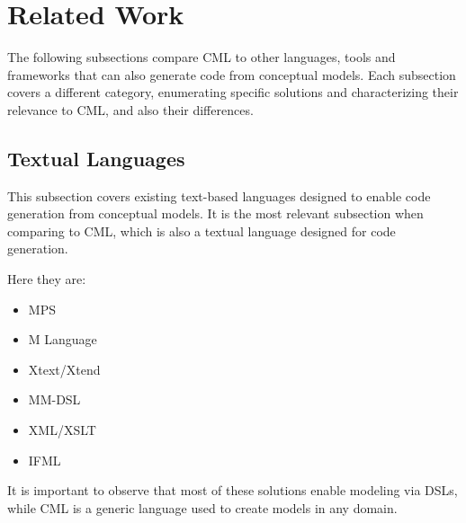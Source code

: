 \section{Related Work}\label{sec:related}

The following subsections compare CML to other languages, tools and frameworks
that can also generate code from conceptual models.
Each subsection covers a different category,
enumerating specific solutions and characterizing their relevance to CML, and also their differences. 

\subsection{Textual Languages}

This subsection covers existing text-based languages designed to enable code generation from conceptual models.
It is the most relevant subsection when comparing to CML,
which is also a textual language designed for code generation.

Here they are:

\begin{itemize}
\item MPS
\item M Language
\item Xtext/Xtend
\item MM-DSL
\item XML/XSLT
\item IFML
\end{itemize}

It is important to observe that most of these solutions enable modeling via DSLs, while CML is a generic language used to create models in any domain.